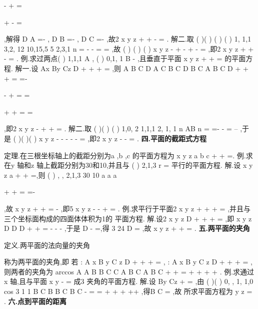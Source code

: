 -
+
=


+
-
=

,解得 
D
A =-
,
D
B =-
,
D
C =-
,故2
x
y
z
+
+
-
=
. 
解二.取
(
)(
)
(
)
(
)
1, 1,1
3,2, 12
10,15,5
5 2,3,1
n =
-
\times 
-
=
=
\rho 
,故 
(
)
(
)
(
)
x
y
z
\cdots 
-
+\cdots 
-
+\cdots 
-
=
,即2
x
y
z
+
+
-
=
. 
\textcolor{lyred}{例}.求过两点(
)
1,1,1
A
,
(
)
0,1, 1
B
-
,且垂直于平面
x
y
z
+
+
=
的平面方程. 
解一.设
Ax
By
Cz
D
+
+
+
=
,则 
A
B
C
D
A
C
B
C
D
B
C
A
B
C
D
+
+
+
=
=-




-
+
=
\Rightarrow 
=




+
+
=
=


,即2
x
y
z
-
+
+
=
. 
解二.取
(
)(
)
(
)
1,0, 2
1,1,1
2, 1, 1
n
AB
n
=
\times 
=-
-
\times 
=
--
\xi \xi \xi \rho 
\rho 
\rho 
,于是 
(
)(
)(
)
x
y
z
-
-
-
-
-
=
,即2
x
y
z
-
-
=
. 
\vspace{4pt}
{\bfseries \textcolor{lyred}{四.平面的截距式方程}}

\textcolor{lyred}{定理}.在三根坐标轴上的截距分别为a ,b ,c 的平面方程为
x
y
z
a
b
c
+
+
=. 
\textcolor{lyred}{例}.求在y 轴和z 轴上截距分别为30和10,并且与
(
)
2,1,3
r =
\rho 
平行的平面方程. 
解.设
x
y
z
a +
+
=,则
(
)
,
,
2,1,3
30 10
a
a
a

\bot
\Rightarrow 
+
+
=
\Rightarrow 
=-




,故 
x
y
z
+
+
=
-
,即5
x
y
z
-
-
+
=
. 
\textcolor{lyred}{例}.求平行于平面2
x
y
z
+
+
+
=
,并且与三个坐标面构成的四面体体积为1的 
平面方程. 
解.设2
x
y
z
D
+
+
+
=
,即
x
y
z
D
D
D
+
+
=
-
-
-
,于是
D
-
=,得 
3 24
D =\pm 
,故
x
y
z
+
+
\pm 
=
. 
\vspace{4pt}
{\bfseries \textcolor{lyred}{五.两平面的夹角}}

\textcolor{lyred}{定义}.两平面的法向量的夹角
\pi 
\theta 
\theta 


\le 
\le 




称为两平面的\textcolor{lyred}{夹角},即 
若
:
A x
B y
C z
D
\Pi 
+
+
+
=
,
:
A x
B y
C z
D
\Pi 
+
+
+
=
,则两者的夹角为 
arccos
A A
B B
C C
A
B
C
A
B
C
\theta 
+
+
=
+
+
\cdots 
+
+
. 
\textcolor{lyred}{例}.求通过x 轴,且与平面
x
y
-
=
成3
\pi 夹角的平面方程. 
解.设
By
Cz
+
=
,由
(
)(
)
0, ,
1, 1,0
cos 3
1 1
B C
B
B
C
B
C
\pi 
\cdots 
-
=
\Rightarrow 
=
+
+
+
\cdots 
++
,得B
C
=\pm 
,故 
所求平面方程为
y
z
\pm 
=
. 
\vspace{4pt}
{\bfseries \textcolor{lyred}{六.点到平面的距离}}

